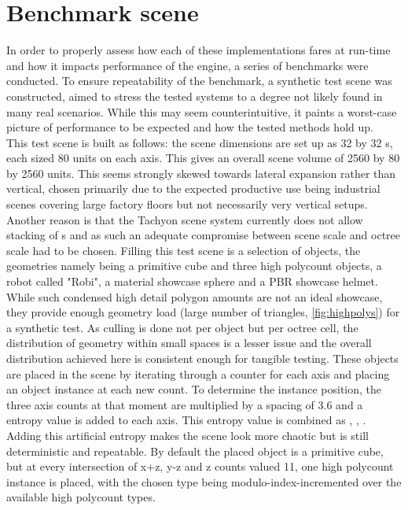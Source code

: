 \section{Benchmark scene}
In order to properly assess how each of these implementations fares at run-time and how it impacts performance of the engine, a series of benchmarks were conducted. To ensure repeatability of the benchmark, a synthetic test scene was constructed, aimed to stress the tested systems to a degree not likely found in many real scenarios. While this may seem counterintuitive, it paints a worst-case picture of performance to be expected and how the tested methods hold up. \\
This test scene is built as follows: the scene dimensions are set up as 32 by 32 s, each  sized 80 units on each axis. This gives an overall scene volume of 2560 by 80 by 2560 units. This seems strongly skewed towards lateral expansion rather than vertical, chosen primarily due to the expected productive use being industrial scenes covering large factory floors but not necessarily very vertical setups. Another reason is that the Tachyon scene  system currently does not allow stacking of s and as such an adequate compromise between scene scale and octree scale had to be chosen. 
Filling this test scene is a selection of objects, the geometries namely being a primitive cube and three high polycount objects, a robot called "Robi", a material showcase sphere and a PBR showcase helmet. While such condensed high detail polygon amounts are not an ideal showcase, they provide enough geometry load (large number of triangles, \autoref{fig:highpolys}) for a synthetic test. As culling is done not per object but per octree cell, the distribution of geometry within small spaces is a lesser issue and the overall distribution achieved here is consistent enough for tangible testing. These objects are placed in the scene by iterating through a counter for each axis and placing an object instance at each new count. To determine the instance position, the three axis counts at that moment are multiplied by a spacing of 3.6 and a entropy value is added to each axis. This entropy value is combined as , , . Adding this artificial entropy makes the scene look more chaotic but is still deterministic and repeatable.
By default the placed object is a primitive cube, but at every intersection of x+z, y-z and z counts valued 11, one high polycount instance is placed, with the chosen type being modulo-index-incremented over the available high polycount types. 
